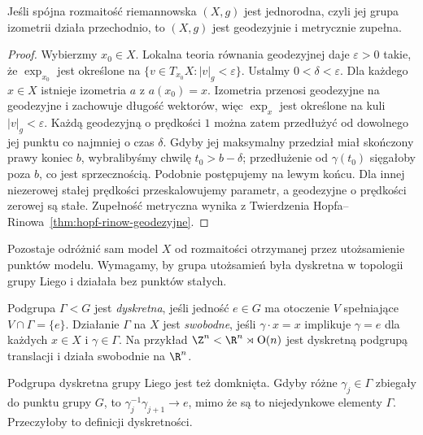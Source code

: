 \begin{stwierdzenie}
\label{prop:klein-jednorodna-zupelna}
Jeśli spójna rozmaitość riemannowska $(X,g)$ jest jednorodna,
czyli jej grupa izometrii działa przechodnio, to $(X,g)$ jest
geodezyjnie i metrycznie zupełna.
\end{stwierdzenie}
\begin{proof}
Wybierzmy $x_0\in X$. Lokalna teoria równania geodezyjnej
daje $\varepsilon>0$ takie, że $\exp_{x_0}$ jest określone
na $\{v\in T_{x_0}X:|v|_g<\varepsilon\}$.
Ustalmy $0<\delta<\varepsilon$. Dla każdego $x\in X$
istnieje izometria $a$ z $a(x_0)=x$. Izometria przenosi
geodezyjne na geodezyjne i zachowuje długość wektorów,
więc $\exp_x$ jest określone na kuli $|v|_g<\varepsilon$.
Każdą geodezyjną o prędkości $1$ można zatem przedłużyć
od dowolnego jej punktu co najmniej o czas $\delta$.
Gdyby jej maksymalny przedział miał skończony prawy koniec $b$,
wybralibyśmy chwilę $t_0>b-\delta$; przedłużenie od
$\gamma(t_0)$ sięgałoby poza $b$, co jest sprzecznością.
Podobnie postępujemy na lewym końcu. Dla innej niezerowej
stałej prędkości przeskalowujemy parametr, a geodezyjne
o prędkości zerowej są stałe. Zupełność metryczna wynika
z Twierdzenia Hopfa--Rinowa~\ref{thm:hopf-rinow-geodezyjne}.
\end{proof}

Pozostaje odróżnić sam model $X$ od rozmaitości otrzymanej
przez utożsamienie punktów modelu. Wymagamy, by grupa
utożsamień była dyskretna w topologii grupy Liego i działała
bez punktów stałych.

\begin{definicja}
\label{def:klein-dyskretna-swobodna}
Podgrupa $\Gamma<G$ jest \emph{dyskretna}, jeśli jedność
$e\in G$ ma otoczenie $V$ spełniające $V\cap\Gamma=\{e\}$.
Działanie $\Gamma$ na $X$ jest \emph{swobodne}, jeśli
$\gamma\cdot x=x$ implikuje $\gamma=e$ dla każdych
$x\in X$ i $\gamma\in\Gamma$.
Na przykład $\Z^n<\R^n\rtimes\mathrm O(n)$ jest dyskretną
podgrupą translacji i działa swobodnie na $\R^n$.
\end{definicja}

Podgrupa dyskretna grupy Liego jest też domknięta.
Gdyby różne $\gamma_j\in\Gamma$ zbiegały do punktu grupy $G$,
to $\gamma_j^{-1}\gamma_{j+1}\to e$, mimo że są to niejedynkowe
elementy $\Gamma$. Przeczyłoby to definicji dyskretności.

